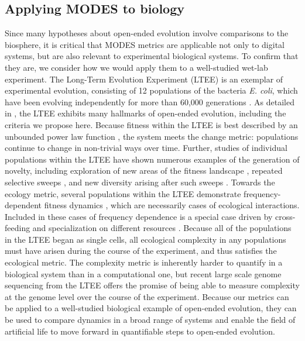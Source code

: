 \documentclass[letterpaper]{article}
\begin{document}
\subsection{Applying MODES to biology}

Since many hypotheses about open-ended evolution involve comparisons to the biosphere, it is critical that MODES metrics are applicable not only to digital systems, but are also relevant to experimental biological systems. To confirm that they are, we consider how we would apply them to a well-studied wet-lab experiment. The Long-Term Evolution Experiment (LTEE) \citep{lenski_long-term_1991} is an exemplar of experimental evolution, consisting of 12 populations of the bacteria \textit{E. coli}, which have been evolving independently for more than 60,000 generations \citep{good_dynamics_2017}.  As detailed in \citep{taylor_open-ended_2016}, the LTEE exhibits many hallmarks of open-ended evolution, including the criteria we propose here.  Because fitness within the LTEE is best described by an unbounded power law function \citep{wiser_long-term_2013,lenski_sustained_2015}, the system meets the change metric: populations continue to change in non-trivial ways over time.  Further, studies of individual populations within the LTEE have shown numerous examples of the generation of novelty, including exploration of new areas of the fitness landscape \citep{tenaillon_tempo_2016}, repeated selective sweeps \citep{maddamsetti_adaptation_2015}, and new diversity arising after such sweeps \citep{blount_genomic_2012}.   Towards the ecology metric, several populations within the LTEE demonstrate frequency-dependent fitness dynamics \citep{ribeck_modeling_2015,rozen_longterm_2000,le_gac_ecological_2012,maddamsetti_adaptation_2015}, which are necessarily cases of ecological interactions.  Included in these cases of frequency dependence is a special case \citep{blount_historical_2008,blount_genomic_2012,turner_replaying_2015} driven by cross-feeding and specialization on different resources \citep{turner_evolution_2015}.  Because all of the populations in the LTEE began as single cells, all ecological complexity in any populations must have arisen during the course of the experiment, and thus satisfies the  ecological metric.  The complexity metric is inherently harder to quantify in a biological system than in a computational one, but recent large scale genome sequencing from the LTEE \citep{tenaillon_tempo_2016} offers the promise of being able to measure complexity at the genome level over the course of the experiment. Because our metrics can be applied to a well-studied biological example of open-ended evolution, they can be used to compare dynamics in a broad range of systems and enable the field of artificial life to move forward in quantifiable steps to open-ended evolution.
\end{document}
